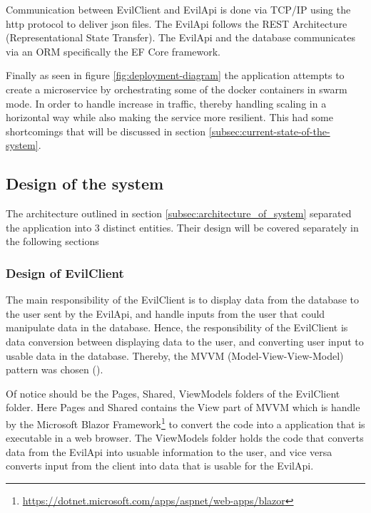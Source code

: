 \documentclass[report/main.tex]{subfiles}
\begin{document}
        Communication between EvilClient and EvilApi is done via TCP/IP using the http protocol to deliver json files. The EvilApi follows the REST Architecture (Representational State Transfer). The EvilApi and the database communicates via an ORM specifically the EF Core framework.
        
        Finally as seen in figure \ref{fig:deployment-diagram} the application attempts to create a microservice by orchestrating some of the docker containers in swarm mode. In order to handle increase in traffic, thereby handling scaling in a horizontal way while also making the service more resilient. This had some shortcomings that will be discussed in section \ref{subsec:current-state-of-the-system}.

    \subsection{Design of the system}
    \label{subsec:design_of_system}
        The architecture outlined in section \ref{subsec:architecture_of_system} separated the application into 3 distinct entities. Their design will be covered separately in the following sections
        
        \subsubsection{Design of EvilClient}
        \label{subsubsec:architexture_of_evilclient}
            The main responsibility of the EvilClient is to display data from the database to the user sent by the EvilApi, and handle inputs from the user that could manipulate data in the database. Hence, the responsibility of the EvilClient is data conversion between displaying data to the user, and converting user input to usable data in the database. Thereby, the MVVM (Model-View-View-Model) pattern was chosen (\cite{ms-mvvm}).
            
            Of notice should be the Pages, Shared, ViewModels folders of the EvilClient folder. Here Pages and Shared contains the View part of MVVM which is handle by the Microsoft Blazor Framework\footnote{\hyperlink{https://dotnet.microsoft.com/apps/aspnet/web-apps/blazor}{https://dotnet.microsoft.com/apps/aspnet/web-apps/blazor}} to convert the code into a application that is executable in a web browser. The ViewModels folder holds the code that converts data from the EvilApi into usuable information to the user, and vice versa converts input from the client into data that is usable for the EvilApi.
\end{document}

